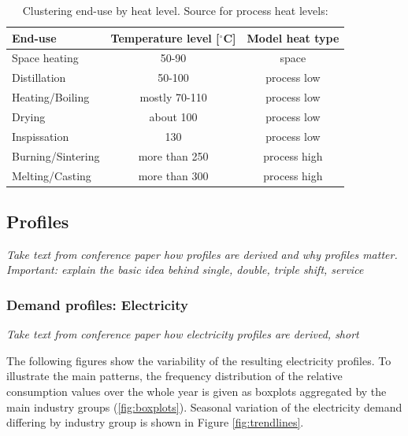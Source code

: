 \documentclass[review]{elsarticle}
\begin{document}
\begin{table}
\begin{tabular}{l | c | c}
End-use & Temperature level [$^{\circ}$C] & Model heat type\\
\hline \hline
Space heating & 50-90 & space  \\ 
Distillation & 50-100 & process low \\
Heating/Boiling & mostly 70-110 & process low \\
Drying & about 100 & process low \\
Inspissation & 130 & process low \\ 
Burning/Sintering & more than 250 & process high \\ 
Melting/Casting & more than 300 & process high  
\end{tabular}
\caption{Clustering end-use by heat level. Source for process heat levels: \cite{VM2015}}
\end{table}


\subsection{Profiles}

\textit{Take text from conference paper how profiles are derived and why profiles matter. Important: explain the basic idea behind single, double, triple shift, service}

\subsubsection{Demand profiles: Electricity}

\textit{Take text from conference paper how electricity profiles are derived, short}

The following figures show the variability of the resulting electricity profiles. To illustrate the main patterns, the frequency distribution of the relative consumption values over the whole year is given as boxplots aggregated by the main industry groups (\ref{fig:boxplots}). Seasonal variation of the electricity demand differing by industry group is shown in Figure \ref{fig:trendlines}.
\end{document}

